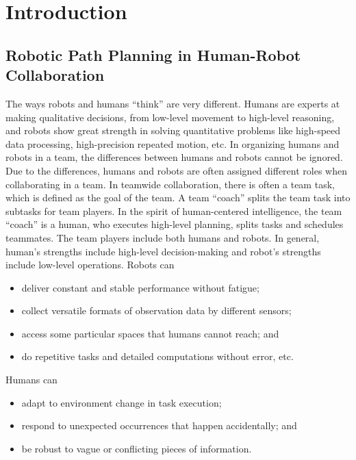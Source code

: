 \documentclass[phd]{byuprop}
\title{\Title}
\author{\Author}
\begin{document}
\maketitle

\section{Introduction}
\label{sec:intro}

\subsection{Robotic Path Planning in Human-Robot Collaboration}
\label{sec:intro:robotic_path_planning_in_human_robot_collaboration}

The ways robots and humans ``think'' are very different.
Humans are experts at making qualitative decisions, from low-level movement to high-level reasoning,
and robots show great strength in solving quantitative problems like high-speed data processing, high-precision repeated motion, etc.
In organizing humans and robots in a team, the differences between humans and robots cannot be ignored.
Due to the differences, humans and robots are often assigned different roles when collaborating in a team.
In teamwide collaboration, there is often a team task, which is defined as the goal of the team.
A team ``coach'' splits the team task into subtasks for team players.
In the spirit of human-centered intelligence, the team ``coach'' is a human, who executes high-level planning, splits tasks and schedules teammates.
The team players include both humans and robots.
In general, human's strengths include high-level decision-making and robot's strengths include low-level operations.
Robots can
\begin{itemize}
\item deliver constant and stable performance without fatigue;
\item collect versatile formats of observation data by different sensors;
\item access some particular spaces that humans cannot reach; and
\item do repetitive tasks and detailed computations without error, etc.
\end{itemize}
Humans can
\begin{itemize}
\item adapt to environment change in task execution;
\item respond to unexpected occurrences that happen accidentally; and
\item be robust to vague or conflicting pieces of information. 
\end{itemize}
  
\end{document}
